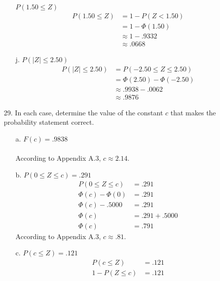 \documentclass[letterpaper,12pt]{article}
\begin{document}
\begin{enumerate}
\begin{enumerate}
        $P(1.50 \le Z)$
        \begin{align*}
          P(1.50 \le Z) &= 1 - P(Z < 1.50) \\
          &= 1 - \Phi(1.50) \\
          &\approx 1 - .9332 \\
          &\approx .0668
        \end{align*}
        \begin{center}
        \end{center}
      \item[j.]
        $P(|Z| \le 2.50)$
        \begin{align*}
          P(|Z| \le 2.50) &= P(-2.50 \le Z \le 2.50) \\
          &= \Phi(2.50) - \Phi(-2.50) \\
          &\approx .9938 - .0062 \\
          &\approx .9876
        \end{align*}
        \begin{center}
        \end{center}
    \end{enumerate}
  \item[29.]
    In each case, determine the value of the constant $c$ that makes the probability statement correct.
    \begin{enumerate}
      \item[a.]
        $F(c) = .9838$ \\
        \\
        According to Appendix A.3, $c \approx 2.14$.
      \item[b.]
        $P(0 \le Z \le c) = .291$
        \begin{align*}
          P(0 \le Z \le c) &= .291 \\
          \Phi(c) - \Phi(0) &= .291 \\
          \Phi(c) - .5000 &= .291 \\
          \Phi(c) &= .291 + .5000 \\
          \Phi(c) &= .791
        \end{align*}
        According to Appendix A.3, $c \approx .81$.
      \item[c.]
        $P(c \le Z) = .121$
        \begin{align*}
          P(c \le Z) &= .121 \\
          1 - P(Z \le c) &= .121 \\

\end{align*}
\end{enumerate}
\end{enumerate}
\end{document}
